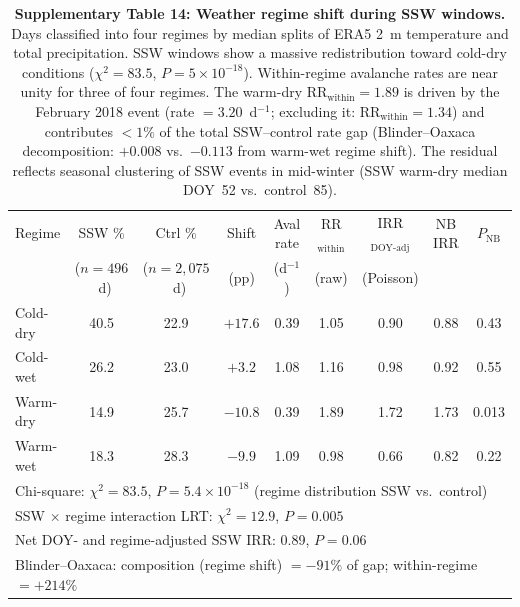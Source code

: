 \begin{table}[!ht]
\centering
\caption{\textbf{Supplementary Table 14: Weather regime shift during SSW windows.}
Days classified into four regimes by median splits of ERA5 2~m temperature and total precipitation. SSW windows show a massive redistribution toward cold-dry conditions ($\chi^2 = 83.5$, $P = 5 \times 10^{-18}$). Within-regime avalanche rates are near unity for three of four regimes. The warm-dry $\mathrm{RR}_{\mathrm{within}} = 1.89$ is driven by the February 2018 event (rate $= 3.20$~d$^{-1}$; excluding it: $\mathrm{RR}_{\mathrm{within}} = 1.34$) and contributes $< 1\%$ of the total SSW--control rate gap (Blinder--Oaxaca decomposition: $+0.008$ vs.\ $-0.113$ from warm-wet regime shift). The residual reflects seasonal clustering of SSW events in mid-winter (SSW warm-dry median DOY~52 vs.\ control~85).}
\label{tab:regime}
\small
\begin{tabular}{lcccccccc}
\toprule
Regime & SSW \% & Ctrl \% & Shift & Aval rate & RR$_{\mathrm{within}}$ & IRR$_{\mathrm{DOY\text{-}adj}}$ & NB IRR & $P_{\mathrm{NB}}$ \\
 & ($n = 496$~d) & ($n = 2{,}075$~d) & (pp) & (d$^{-1}$) & (raw) & (Poisson) & & \\
\midrule
Cold-dry & 40.5 & 22.9 & $+17.6$ & 0.39 & 1.05 & 0.90 & 0.88 & 0.43 \\
Cold-wet & 26.2 & 23.0 & $+3.2$ & 1.08 & 1.16 & 0.98 & 0.92 & 0.55 \\
Warm-dry & 14.9 & 25.7 & $-10.8$ & 0.39 & 1.89 & 1.72 & 1.73 & 0.013 \\
Warm-wet & 18.3 & 28.3 & $-9.9$ & 1.09 & 0.98 & 0.66 & 0.82 & 0.22 \\
\midrule
\multicolumn{9}{l}{Chi-square: $\chi^2 = 83.5$, $P = 5.4 \times 10^{-18}$ (regime distribution SSW vs.\ control)} \\
\multicolumn{9}{l}{SSW $\times$ regime interaction LRT: $\chi^2 = 12.9$, $P = 0.005$} \\
\multicolumn{9}{l}{Net DOY- and regime-adjusted SSW IRR: 0.89, $P = 0.06$} \\
\multicolumn{9}{l}{Blinder--Oaxaca: composition (regime shift) $= -91\%$ of gap; within-regime $= +214\%$} \\
\bottomrule
\end{tabular}
\end{table}


